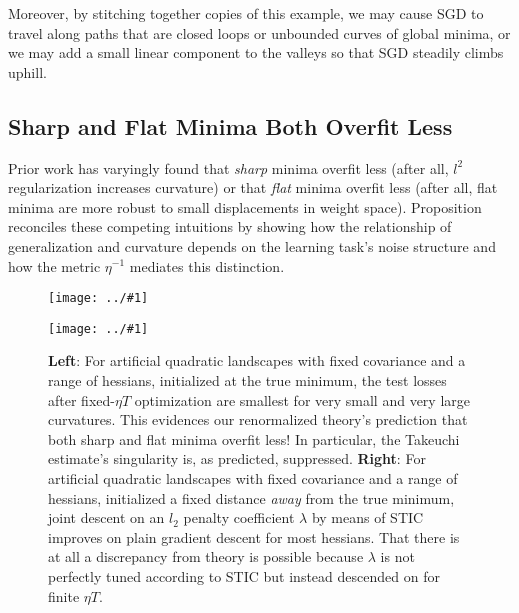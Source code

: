 \documentclass{article}
\newcommand{\plotmoo}[3]{
    \texttt{[image: ../\#1]}
}
\begin{document}
        Moreover, by stitching together copies of this example, we may cause
        SGD to travel along paths that are closed loops or unbounded curves of
        global minima, or we may add a small linear component to the valleys so
        that SGD steadily climbs uphill.  



    \subsection{Sharp and Flat Minima Both Overfit Less} \label{subsect:overfit}
        Prior work has varyingly found that \emph{sharp} minima overfit less
        (after all, $l^2$ regularization increases curvature) or that
        \emph{flat} minima overfit less (after all, flat minima are more
        robust to small displacements in weight space).  Proposition
        \label{prop:overfit} reconciles these competing intuitions by showing
        how the relationship of generalization and curvature depends on the
        learning task's noise structure and how the metric $\eta^{-1}$ mediates
        this distinction.
        
        \begin{figure}[h!] 
            \centering
            \plotmoo{plots/tak}{0.48\columnwidth}{4.0cm}
            \plotmoo{plots/tak-reg}{0.48\columnwidth}{4.0cm}
            \caption{
                {\bf Left}: For artificial quadratic landscapes with fixed
                covariance and a range of hessians, initialized at the true
                minimum, the test losses after fixed-$\eta T$ optimization are
                smallest for very small and very large curvatures.  This
                evidences our renormalized theory's prediction that both sharp
                and flat minima overfit less!  In particular, the Takeuchi
                estimate's singularity is, as predicted, suppressed.
                {\bf Right}: For artificial quadratic landscapes with fixed
                covariance and a range of hessians, initialized a fixed
                distance \emph{away} from the true minimum, joint descent on 
                an $l_2$ penalty coefficient $\lambda$ by means of STIC
                improves on plain gradient descent for most hessians.  That
                there is at all a discrepancy from theory is possible because
                $\lambda$ is not perfectly tuned according to STIC but instead
                descended on for finite $\eta T$.
            }
            \label{fig:tak}
        \end{figure}
\end{document}
